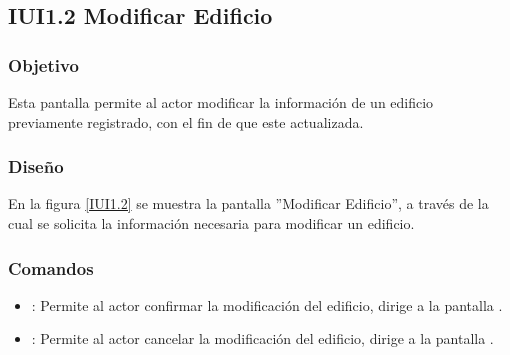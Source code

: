 \subsection{IUI1.2 Modificar Edificio}

\subsubsection{Objetivo}
	Esta pantalla permite al actor modificar la información de un edificio previamente registrado, con el fin de que este actualizada.

\subsubsection{Diseño}
	En la figura \ref{IUI1.2} se muestra la pantalla ''Modificar Edificio'', a través de la cual se solicita la información necesaria para modificar un edificio.


\subsubsection{Comandos}
\begin{itemize}
	\item {}: Permite al actor confirmar la modificación del edificio, dirige a la pantalla .
	
	\item {}: Permite al actor cancelar la modificación del edificio, dirige a la pantalla .
\end{itemize}
